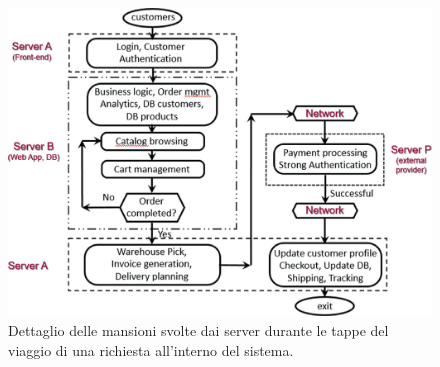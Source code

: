 \begin{figure}
    \centering
    \includegraphics[width=\linewidth]{figs/ABAPA.png}
        \caption{Dettaglio delle mansioni svolte dai server durante le tappe del viaggio di una richiesta all'interno del sistema. \citep{DBLP:books/sp/Serazzi24}}
    \label{fig:abapa}
\end{figure}

